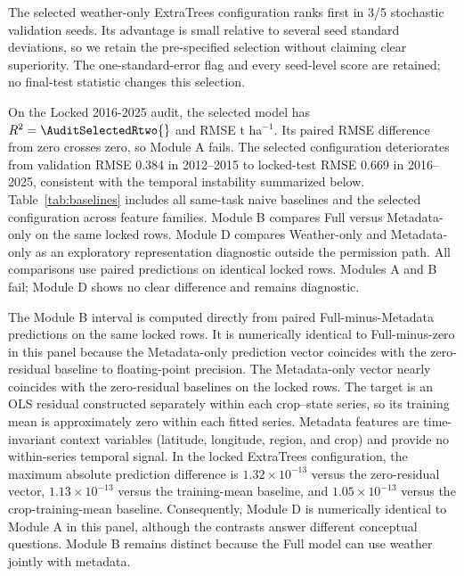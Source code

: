 \documentclass[conference]{IEEEtran}
\begin{document}
The selected weather-only ExtraTrees configuration ranks first in 3/5 stochastic
validation seeds. Its advantage is small relative to several seed standard
deviations, so we retain the pre-specified selection without claiming clear
superiority. The one-standard-error flag and every seed-level
score are retained; no final-test statistic changes this selection.

On the Locked 2016-2025 audit, the selected model has
$R^2=\AuditSelectedRtwo{}$ and RMSE
\AuditSelectedRMSE{} t ha$^{-1}$. Its paired RMSE difference from zero crosses
zero, so Module A fails. The selected configuration deteriorates from validation
RMSE 0.384 in 2012--2015 to locked-test RMSE 0.669 in 2016--2025, consistent with
the temporal instability summarized below. Table~\ref{tab:baselines} includes all
same-task naive baselines and the selected configuration across feature families.
Module B compares Full versus Metadata-only on the same locked rows. Module D
compares Weather-only and Metadata-only as an exploratory representation
diagnostic outside the permission path. All comparisons use paired predictions on
identical locked rows. Modules A and B fail; Module D shows no clear difference
and remains diagnostic.

The Module B interval is computed directly from paired Full-minus-Metadata
predictions on the same locked rows. It is numerically identical to
Full-minus-zero in this panel because the Metadata-only prediction vector
coincides with the zero-residual baseline to floating-point precision.
The Metadata-only vector nearly coincides with the zero-residual baselines on the
locked rows. The target is an OLS residual constructed separately within each
crop--state series, so its training mean is approximately zero within each fitted
series. Metadata features are time-invariant context variables (latitude,
longitude, region, and crop) and provide no within-series temporal signal. In the
locked ExtraTrees configuration, the maximum absolute prediction difference is
$1.32\times10^{-13}$ versus the zero-residual vector, $1.13\times10^{-13}$ versus
the training-mean baseline, and $1.05\times10^{-13}$ versus the crop-training-mean
baseline. Consequently, Module D is numerically identical to Module A in this panel,
although the contrasts answer different conceptual questions. Module B remains
distinct because the Full model can use weather jointly with metadata.

\begin{table}[t]
\centering
\caption{Locked 2016--2025 same-task audit. Learned-model predictions are seed
aggregated. $\Delta$RMSE is model minus zero-residual RMSE with paired 95\%
year-block intervals; RMSE is t ha$^{-1}$. The Module B contrast is computed
directly as Full minus Metadata-only; in this panel it matches Full minus zero
because Metadata-only predictions coincide with the zero-residual vector to
floating-point precision.}
\label{tab:baselines}
\scriptsize
\resizebox{\textwidth}{!}{}
\end{table}
\end{document}
